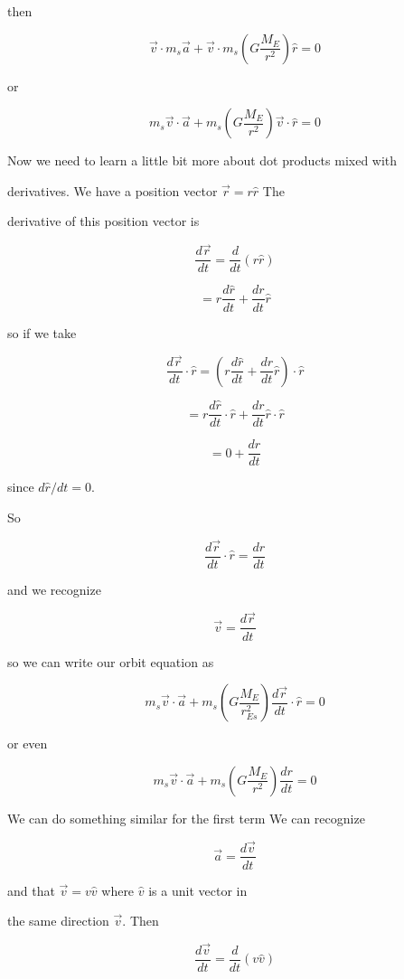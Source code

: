 then 

$$\overrightarrow{v}\cdot m_{s}\overrightarrow{a}+\overrightarrow{v}\cdot m_{s}\left( G\frac{M_{E}}{r^{2}}\right) \hat{r}=0 $$

or

$$m_{s}\overrightarrow{v}\cdot \overrightarrow{a}+m_{s}\left( G\frac{M_{E}}{r^{2}}\right) \overrightarrow{v}\cdot \hat{r}=0 $$

Now we need to learn a little bit more about dot products mixed with

derivatives. We have a position vector $\overrightarrow{r}=r\hat{r}$ The

derivative of this position vector is 

$$\frac{d\overrightarrow{r}}{dt}=\frac{d}{dt}\left( r\hat{r}\right) $$

$$=r\frac{d\hat{r}}{dt}+\frac{dr}{dt}\hat{r}$$


so if we take 

$$\frac{d\overrightarrow{r}}{dt}\cdot \hat{r}=\left( r\frac{d\hat{r}}{dt}+\frac{dr}{dt}\hat{r}\right) \cdot \hat{r}$$


$$=r\frac{d\hat{r}}{dt}\cdot \hat{r}+\frac{dr}{dt}\hat{r}\cdot \hat{r}$$%

$$=0+\frac{dr}{dt}$$%

since $d\hat{r}/dt=0.$


So 

$$\frac{d\overrightarrow{r}}{dt}\cdot \hat{r}=\frac{dr}{dt}$$

and we recognize 

$$\overrightarrow{v}=\frac{d\overrightarrow{r}}{dt}$$

so we can write our orbit equation as%

$$m_{s}\overrightarrow{v}\cdot \overrightarrow{a}+m_{s}\left( G\frac{M_{E}}{r_{Es}^{2}}\right) \frac{d\overrightarrow{r}}{dt}\cdot \hat{r}=0$$

or even 

$$m_{s}\overrightarrow{v}\cdot \overrightarrow{a}+m_{s}\left( G\frac{M_{E}}{r^{2}}\right) \frac{dr}{dt}=0$$

We can do something similar for the first term We can recognize 

$$\overrightarrow{a}=\frac{d\overrightarrow{v}}{dt}$$

and that $\overrightarrow{v}=v\hat{v}$ where $\hat{v}$ is a unit vector in

the same direction $\overrightarrow{v}.$ Then 

$$\frac{d\overrightarrow{v}}{dt}=\frac{d}{dt}\left( v\hat{v}\right) $$

